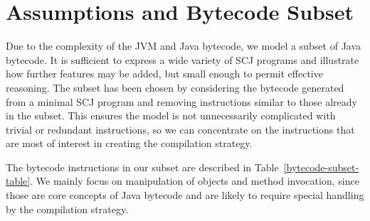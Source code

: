 \section{Assumptions and Bytecode Subset}
\label{cee-assumptions-section}

Due to the complexity of the JVM and Java bytecode, we model a subset
of Java bytecode.
It is sufficient to express a wide variety of SCJ programs and
illustrate how further features may be added, but small enough to
permit effective reasoning.
The subset has been chosen by considering the bytecode generated from
a minimal SCJ program and removing instructions similar to those
already in the subset.
This ensures the model is not unnecessarily complicated with trivial
or redundant instructions, so we can concentrate on the instructions
that are most of interest in creating the compilation strategy.

The bytecode instructions in our subset are described in
Table~\ref{bytecode-subset-table}.
We mainly focus on manipulation of objects and method invocation,
since those are core concepts of Java bytecode and are likely to
require special handling by the compilation strategy.

